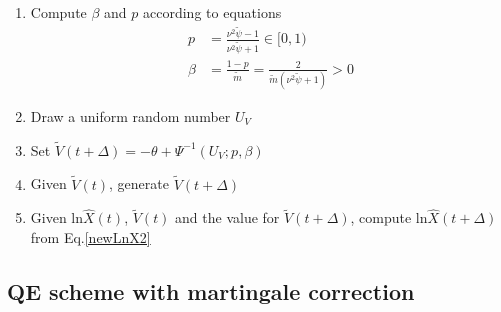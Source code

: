 \documentclass{ws-ijfe}
\begin{document}
\begin{enumerate}
\begin{enumerate}
  \item Compute $\beta$ and $p$ according to equations
  \begin{align*}
    p & =\frac{\nu^2\tilde{\psi}-1}{\nu^2\tilde{\psi}+1}\in[0,1) \\
    \beta & =\frac{1-p}{\tilde{m}}=\frac{2}{\tilde{m}(\nu^2\tilde{\psi}+1)}>0
  \end{align*}
  \item Draw a uniform random number $U_V$
  \item Set $\tilde{V}(t+\Delta)=-\theta+\Psi^{-1}(U_V;p,\beta)$
  \item Given $\tilde{V}(t)$, generate $\tilde{V}(t+\Delta)$
  \item Given ln$\hat{X}(t)$, $\tilde{V}(t)$ and the value for $\tilde{V}(t+\Delta)$, compute ln$\hat{X}(t+\Delta)$ from Eq.\eqref{newLnX2}
\end{enumerate}
\end{enumerate}
\subsection{QE scheme with martingale correction}
\end{document}
